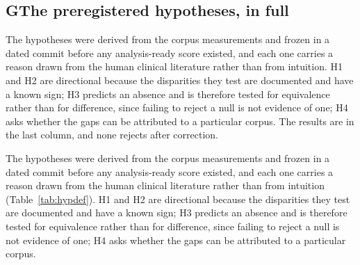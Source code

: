 \clearpage
\onecolumn

\subsection*{G\quad The preregistered hypotheses, in full}

\noindent The hypotheses were derived from the corpus measurements and frozen in
a dated commit before any analysis-ready score existed, and each one carries a
reason drawn from the human clinical literature rather than from intuition. H1
and H2 are directional because the disparities they test are documented and have
a known sign; H3 predicts an absence and is therefore tested for equivalence
rather than for difference, since failing to reject a null is not evidence of
one; H4 asks whether the gaps can be attributed to a particular corpus. The
results are in the last column, and none rejects after correction.

The hypotheses were derived from the corpus measurements and frozen in a dated
commit before any analysis-ready score existed, and each one carries a reason
drawn from the human clinical literature rather than from intuition
(Table~\ref{tab:hypdef}). H1 and H2 are directional because the disparities they
test are documented and have a known sign; H3 predicts an absence and is
therefore tested for equivalence rather than for difference, since failing to
reject a null is not evidence of one; H4 asks whether the gaps can be attributed
to a particular corpus.

